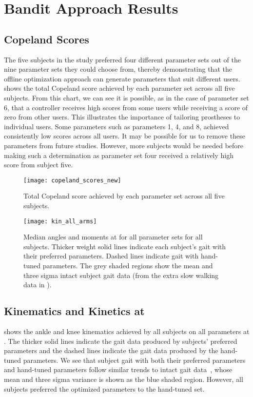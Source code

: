 \section{Bandit Approach Results} 

\subsection{Copeland Scores}

The five subjects in the study preferred four different parameter sets out of
the nine parameter sets they could choose from, thereby demonstrating that the
offline optimization approach can generate parameters that suit different users.
 shows the total Copeland score achieved by each parameter
set across all five subjects. From this chart, we can see it is possible, as in
the case of parameter set 6, that a controller receives high scores from some
users while receiving a score of zero from other users. This illustrates the
importance of tailoring prostheses to individual users. Some parameters such as
parameters 1, 4, and 8, achieved consistently low scores across all users. It
may be possible for us to remove these parameters from future studies. However,
more subjects would be needed before making such a determination as parameter
set four received a relatively high score from subject five.

\begin{figure}[b]
    \centering
    \texttt{[image: copeland\_scores\_new]}
    \caption{Total Copeland score achieved by each parameter set across all five
    subjects.}\label{fig:copeland}
\end{figure}

\begin{figure}[t]
    \centering
    \texttt{[image: kin\_all\_arms]}
    \caption{Median angles and moments at  for all parameter
    sets for all subjects. Thicker weight solid lines indicate each subject's
    gait with their preferred parameters. Dashed lines indicate gait with
    hand-tuned parameters. The grey shaded regions show the mean and three sigma
    intact subject gait data (from the extra slow walking data in
    \citep{bovi2011multiple}).}\label{fig:kin_all_arms} 
    \vspace{-0.3cm}
\end{figure}

\subsection{Kinematics and Kinetics at }
 shows the ankle and knee kinematics achieved by all
subjects on all parameters at . The thicker solid lines
indicate the gait data produced by subjects' preferred parameters and the dashed
lines indicate the gait data produced by the hand-tuned parameters. We see that
subject gait with both their preferred parameters and hand-tuned parameters
follow similar trends to intact gait data~\citep{bovi2011multiple}, whose mean
and three sigma variance is shown as the blue shaded region. However, all
subjects preferred the optimized parameters to the hand-tuned set. 

